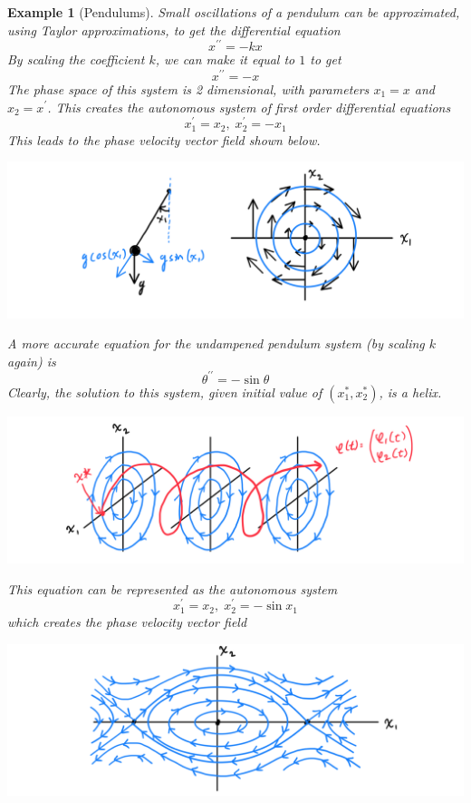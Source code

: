 \documentclass{article}
\newtheorem{example}{Example}[section]
\theoremstyle{remark}
\theoremstyle{definition}
\begin{document}
\begin{example}[Pendulums]
Small oscillations of a pendulum can be approximated, using Taylor approximations, to get the differential equation 
\[x^{\prime \prime} = - k x\]
By scaling the coefficient $k$, we can make it equal to $1$ to get
\[x^{\prime \prime} = -x\]
The phase space of this system is 2 dimensional, with parameters $x_1 = x$ and $x_2 = x^\prime$. This creates the autonomous system of first order differential equations
\[x^\prime_1 = x_2, \; x_2^\prime = -x_1\]
This leads to the phase velocity vector field shown below. 
\begin{center}
    \includegraphics[scale=0.25]{img/Undampened_Simple_Pendulum.PNG}
\end{center}
A more accurate equation for the undampened pendulum system (by scaling $k$ again) is 
\[\theta^{\prime \prime} = -\sin{\theta}\]
Clearly, the solution to this system, given initial value of $(x_1^*, x_2^*)$, is a helix.
\begin{center}
    \includegraphics[scale=0.25]{img/Helix_Solution.PNG}
\end{center}
This equation can be represented as the autonomous system
\[x_1^\prime = x_2, \; x_2^\prime = - \sin{x_1} \]
which creates the phase velocity vector field
\begin{center}
    \includegraphics[scale=0.25]{img/Undampened_Accurate_Pendulum.PNG}
\end{center}
\end{example}
\end{document}
